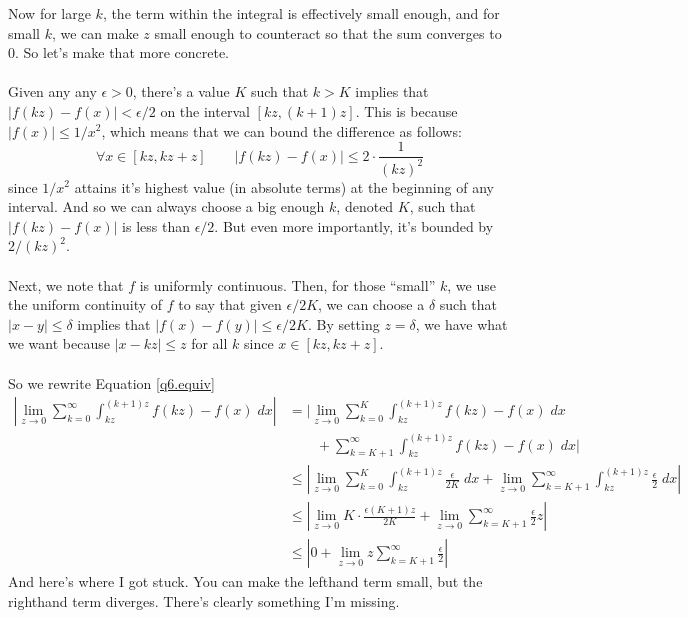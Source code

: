 \documentclass[12pt]{article}
\theoremstyle{plain}
\theoremstyle{definition}
\theoremstyle{remark}
\begin{document}
\begin{enumerate}
\begin{enumerate}
Now for large $k$, the term within the integral is effectively small enough, and for small $k$, we can make $z$ small enough to counteract so that the sum converges to 0. So let's make that more concrete.
\\
\\
Given any any $\epsilon>0$, there's a value $K$ such that $k>K$ implies that $|f(kz) - f(x)|<\epsilon/2$ on the interval $[kz, (k+1)z]$.  This is because $|f(x)|\leq 1/x^2$, which means that we can bound the difference as follows:
    \[ \forall x \in [kz, kz+z] \qquad |f(kz) - f(x)| \leq 2\cdot\frac{1}{(kz)^2} \]
since $1/x^2$ attains it's highest value (in absolute terms) at the beginning of any interval. And so we can always choose a big enough $k$, denoted $K$, such that $|f(kz) - f(x)|$ is less than $\epsilon/2$.  But even more importantly, it's bounded by $2/(kz)^2$.
\\
\\
Next, we note that $f$ is uniformly continuous.  Then, for those ``small'' $k$, we use the uniform continuity of $f$ to say that given $\epsilon/2K$, we can choose a $\delta$ such that $|x-y| \leq \delta$ implies that $|f(x)-f(y)|\leq\epsilon/2K$. By setting $z=\delta$, we have what we want because $|x-kz|\leq z$ for all $k$ since $x \in [kz, kz+z]$.
\\
\\
So we rewrite Equation \ref{q6.equiv}
\begin{align*}
    \left\lvert\lim_{z\rightarrow 0} 
        \sum^\infty_{k=0} \int^{(k+1)z}_{kz} f(kz) - f(x) \; dx 
        \right\rvert &=
        \lvert\lim_{z\rightarrow 0} 
        \sum^K_{k=0} \int^{(k+1)z}_{kz} f(kz) - f(x) \; dx \\
   &\qquad
        + \sum^\infty_{k=K+1} \int^{(k+1)z}_{kz} f(kz) - f(x) \; dx 
       \rvert \\
    &\leq 
        \left\lvert \lim_{z\rightarrow 0}
        \sum^K_{k=0} \int^{(k+1)z}_{kz} \frac{\epsilon}{2K} \; dx +
       \lim_{z\rightarrow 0}  \sum^\infty_{k=K+1} \int^{(k+1)z}_{kz} \frac{\epsilon}{2} \; dx 
        \right\rvert \\
    &\leq \left\lvert \lim_{z\rightarrow 0} K \cdot \frac{\epsilon(K+1)z}{2K} 
	+ \lim_{z\rightarrow 0} \sum^\infty_{k=K+1} \frac{\epsilon}{2} z 
	\right\rvert \\
    &\leq \left\lvert 0
	+ \lim_{z\rightarrow 0} z \sum^\infty_{k=K+1} \frac{\epsilon}{2} 
	\right\rvert
\end{align*}
And here's where I got stuck. You can make the lefthand term small, but the righthand term diverges.  There's clearly something I'm missing.



\end{enumerate}

\end{enumerate}
\end{document}
